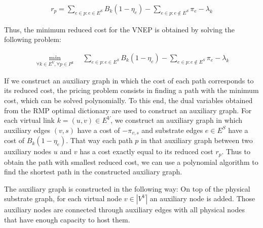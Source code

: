 \begin{align}
  r_{p} = \sum\limits_{e \in p : e \in E^S} B_{k} (1 - \eta_{e}) - \sum\limits_{e \in p : e \notin E^S} \pi_e - \lambda_{k} \nonumber
\end{align}

Thus, the minimum reduced cost for the VNEP is obtained by solving the following problem:

\begin{align}
  \min_{ \forall k \in E^{V}, \forall p \in P^{k}}  \quad  \sum\limits_{e \in p : e \in E^S} B_{k} (1 - \eta_{e}) - \sum\limits_{e \in p : e \notin E^S} \pi_{e}-\lambda_{k} \nonumber
\end{align}

If we construct an auxiliary graph in which the cost of each path corresponds to its reduced cost, 
the pricing problem consists in finding a path with the minimum cost, which can be solved polynomially.
To this end, the dual variables obtained from the RMP optimal dictionary are used to construct an auxiliary graph.
For each virtual link $k = (u,v) \in E^V$, we construct an auxiliary graph in which auxiliary edges $(v,s)$ have a cost of $-\pi_{v,s}$ and substrate edges $e \in E^S$ have a cost of $B_{k}(1 - \eta_{e})$. 
That way each path $p$ in that auxiliary graph between two auxiliary nodes $u$ and $v$ has a cost exactly equal to its reduced cost $r_p$.
Thus to obtain the path with smallest reduced cost, we can use a polynomial algorithm to find the shortest path in the constructed auxiliary graph.

The auxiliary graph is constructed in the following way:
On top of the physical substrate graph, for each virtual node $v \in |V^V|$ an auxiliary node is added.
Those auxiliary nodes are connected through auxiliary edges with all physical nodes that have enough capacity to host them.

